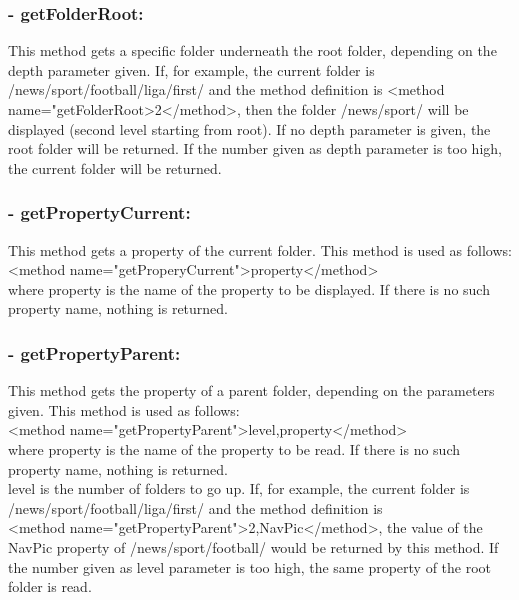 \subsubsection{- getFolderRoot:} 

  This method gets a specific folder underneath the root folder, depending on the depth 
parameter given. If, for example, the current folder is {\dir /news/sport/football/liga/first/} 
and the method definition is {\tag <method name="getFolderRoot>2</method>}, then the 
folder {\dir /news/sport/} will be displayed (second level starting from root). If 
no depth parameter is given, the root folder will be returned. If the number given 
as depth parameter is too high, the current folder will be returned. \\

\subsubsection{- getPropertyCurrent:} 

  This method gets a property of the current folder. This method is used as follows:\\
{\tag <method name="getProperyCurrent">property</method>} \\
where property is the name of the property to be displayed. If there is no such property name, 
nothing is returned. \\

\subsubsection{- getPropertyParent:} 

 This method gets the property of a parent folder, depending on the parameters given. This 
method is used as follows:\\
{\tag <method name="getPropertyParent">level,property</method>} \\
where {\name property} is the name of the property to be read. If there is no such property name, 
nothing is returned. \\
{\name level} is the number of folders to go up. If, for example, the current folder is 
{\dir /news/sport/foot\-ball/li\-ga/first/} and the method definition is \\
{\tag <me\-thod name="get\-Property\-Parent">2,NavPic</me\-thod>}, the value of the 
{\name NavPic} property of {\dir /news/sport/football/} would be returned by 
this method. If the number given as level parameter is too high, the same property of 
the root folder is read. \\


